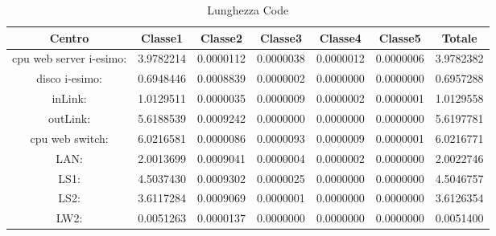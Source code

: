 \begin{table}[H]
\begin{center}\begin{scriptsize}
\begin{tabular}{||c|c|c|c|c|c|c||}
\hline
Centro &Classe1 &Classe2 &Classe3 &Classe4 &Classe5 &Totale\\
\hline
\hline
 cpu web server i-esimo: 	&3.9782214	&0.0000112	&0.0000038	&0.0000012	&0.0000006	&3.9782382\\
\hline
 disco i-esimo: 	&0.6948446	&0.0008839	&0.0000002	&0.0000000	&0.0000000	&0.6957288\\
\hline
 inLink: 	&1.0129511	&0.0000035	&0.0000009	&0.0000002	&0.0000001	&1.0129558\\
\hline
 outLink: 	&5.6188539	&0.0009242	&0.0000000	&0.0000000	&0.0000000	&5.6197781\\
\hline
 cpu web switch: 	&6.0216581	&0.0000086	&0.0000093	&0.0000009	&0.0000001	&6.0216771\\
\hline
 LAN: 	&2.0013699	&0.0009041	&0.0000004	&0.0000002	&0.0000000	&2.0022746\\
\hline
 LS1: 	&4.5037430	&0.0009302	&0.0000025	&0.0000000	&0.0000000	&4.5046757\\
\hline
 LS2: 	&3.6117284	&0.0009069	&0.0000001	&0.0000000	&0.0000000	&3.6126354\\
\hline
 LW2: 	&0.0051263	&0.0000137	&0.0000000	&0.0000000	&0.0000000	&0.0051400\\
\hline
\end{tabular}
\end{scriptsize}\end{center}
\caption{Lunghezza Code}
\label{lunghezzacode}
\end{table}

